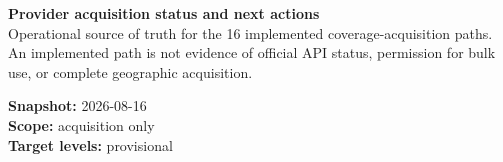\documentclass[9pt,a4paper]{article}
\begin{document}
\begin{minipage}[t]{0.74\textwidth}
  {\LARGE\bfseries\color{navy}Provider acquisition status and next actions}\\[1mm]
  {\small Operational source of truth for the 16 implemented coverage-acquisition paths. An implemented path is not evidence of official API status, permission for bulk use, or complete geographic acquisition.}
\end{minipage}\hfill
\begin{minipage}[t]{0.23\textwidth}
  \RaggedLeft\small
  \textbf{Snapshot:} 2026-08-16\\
  \textbf{Scope:} acquisition only\\
  \textbf{Target levels:} provisional
\end{minipage}

\vspace{3mm}
\scriptsize
{}
\end{document}

